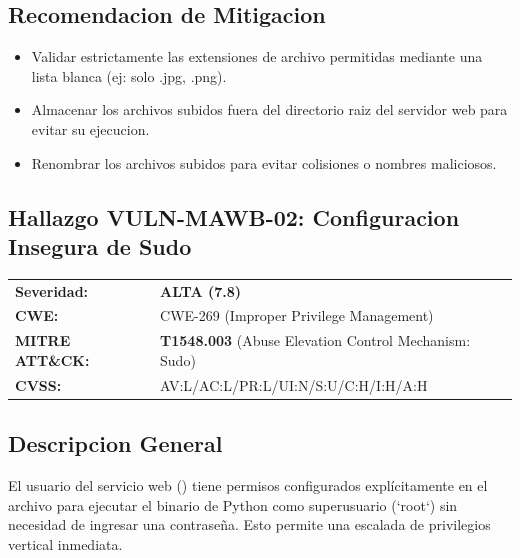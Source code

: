 \documentclass[a4paper]{article}
\newcommand{\maquinaID}{MAWB} %
\begin{document}
\subsection*{Recomendacion de Mitigacion}
\begin{itemize}
    \item Validar estrictamente las extensiones de archivo permitidas mediante una lista blanca (ej: solo .jpg, .png).
    \item Almacenar los archivos subidos fuera del directorio raiz del servidor web para evitar su ejecucion.
    \item Renombrar los archivos subidos para evitar colisiones o nombres maliciosos.
\end{itemize}

\clearpage

\subsection{Hallazgo VULN-\maquinaID-02: Configuracion Insegura de Sudo}

\begin{tcolorbox}[colback=white, colframe=riskHigh, title=\textbf{Hallazgo VULN-\maquinaID-02: Configuracion Insegura de Sudo}]
    \begin{tabularx}{\textwidth}{lX}

        \textbf{Severidad:} & 
        \textcolor{riskHigh}{\textbf{ALTA (7.8)}} \\

        \textbf{CWE:} & 
        CWE-269 (Improper Privilege Management) \\

        \textbf{MITRE ATT\&CK:} & 
        \textbf{T1548.003} (Abuse Elevation Control Mechanism: Sudo) \\

        \textbf{CVSS:} & 
        AV:L/AC:L/PR:L/UI:N/S:U/C:H/I:H/A:H \\

    \end{tabularx}
\end{tcolorbox}

\subsection*{Descripcion General}
El usuario del servicio web () tiene permisos configurados explícitamente en el archivo  para ejecutar el binario de Python como superusuario (`root`) sin necesidad de ingresar una contraseña. Esto permite una escalada de privilegios vertical inmediata.
\end{document}
